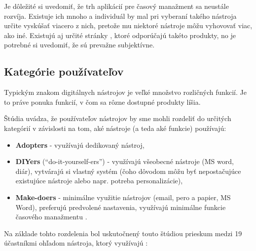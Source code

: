 \documentclass[10pt,slovak,a4paper]{article}
\begin{document}
		Je dôležité si uvedomiť, že trh aplikácií pre časový manažment sa neustále rozvíja. Existuje ich mnoho a individuál by mal pri vyberaní takého nástroja určite vyskúšať viacero z nich, pretože mu niektoré nástroje môžu vyhovovať viac, ako iné. Existujú aj určité stránky \cite{JustinPot9best}, ktoré odporúčajú takéto produkty, no je potrebné si uvedomiť, že sú prevažne subjektívne.
		
	\subsection{Kategórie používateľov}
		
		Typickým znakom digitálnych nástrojov je veľké množstvo rozličných funkcií. Je to práve ponuka funkcií, v čom sa rôzne dostupné produkty líšia.
	
		Štúdia \cite{Haraty} uvádza, že používateľov nástrojov by sme mohli rozdeliť do určitých kategórií v závislosti na tom, aké nástroje (a teda aké funkcie) používajú:
		
		\par
		\begin{itemize}
			\item \textbf{Adopters} - využívajú dedikovaný nástroj,
			\item \textbf{DIYers} (\enquote{do-it-yourself-ers}) - využívajú všeobecné nástroje (MS word, diár), vytvárajú si vlastný systém (čoho dôvodom môžu byť nepostačujúce existujúce nástroje alebo napr. potreba personalizácie),
			\item \textbf{Make-doers} - minimálne využitie nástrojov (email, pero a papier, MS Word), preferujú predvolené nastavenia, využívajú minimálne funkcie časového manažmentu \cite{Haraty}.
		\end{itemize}
		
		Na základe tohto rozdelenia bol uskutočnený touto štúdiou prieskum medzi 19 účastníkmi ohľadom nástroja, ktorý využívajú \cite{Haraty}:
		
\end{document}
